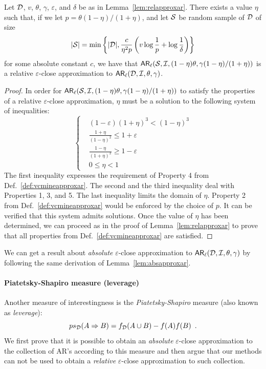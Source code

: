 \begin{lemma}\label{lem:liftrelapproxar}
  Let ${\cal D}$, $v$, $\theta$, $\gamma$, $\varepsilon$, and $\delta$ be as in
  Lemma~\ref{lem:relapproxar}. There exists a value $\eta$ such that, if we let
  $p=\theta(1-\eta)/(1+\eta)$, and let ${\cal S}$ be random sample of ${\cal D}$ of size
  \[
  |{\cal S}|=\min\left\{|{\cal D}|,\frac{c}{\eta^2p}\left(v\log\frac{1}{p}+\log\frac{1}{\delta}\right)\right\}
  \]
  for some absolute constant $c$, we have that
  $\mathsf{AR}_{\ell}({\cal S},{\cal I},(1-\eta)\theta,\gamma(1-\eta)/(1+\eta))$ is a relative
  $\varepsilon$-close approximation to $\mathsf{AR}_{\ell}({\cal D},{\cal I},\theta,\gamma)$.
\end{lemma}
\begin{proof}
 In order for
  $\mathsf{AR}_{\ell}({\cal S},{\cal I},(1-\eta)\theta,\gamma(1-\eta)/(1+\eta))$ to satisfy the
  properties of a relative $\varepsilon$-close approximation, $\eta$
  must be a solution to the following system of inequalities:
 \begin{equation*}
   \left\{
   \begin{aligned}
    &(1-\varepsilon)(1+\eta)^3<(1-\eta)^3\\
    &\frac{1+\eta}{(1-\eta)^2}\le 1+\varepsilon\\
    &\frac{1-\eta}{(1+\eta)^2}\ge 1-\varepsilon\\
    &0\le \eta<1
  \end{aligned}
  \right.
  \end{equation*}
    The first inequality expresses the requirement of Property 4 from
  Def.~\ref{def:vcmineapproxar}. The second and the third inequality deal with
  Properties 1, 3, and 5. The last inequality limits the domain of $\eta$.
  Property 2 from Def.~\ref{def:vcmineapproxar} would be enforced by the choice of
  $p$. It can be verified that this system admits solutions.
Once the value of $\eta$ has been determined, we can proceed as in the
  proof of Lemma~\ref{lem:relapproxar} to prove that all properties from
  Def.~\ref{def:vcmineapproxar} are satisfied.
\end{proof}

We can get a result about \emph{absolute} $\varepsilon$-close approximation to
$\mathsf{AR}_\ell({\cal D},{\cal I},\theta,\gamma)$ by following the same derivation of
Lemma~\ref{lem:absapproxar}.

\paragraph{Piatetsky-Shapiro measure (leverage)}
Another measure of interestingness is the
\emph{Piatetsky-Shapiro} measure (also known as \emph{leverage}):
\[
  ps_{\cal D}(A\Rightarrow B) = f_{\cal D}(A\cup B)-f(A)f(B)\enspace.
\]
We first prove that it is possible to obtain an \emph{absolute}
$\varepsilon$-close approximation to the collection of AR's according to this
measure and then argue that our methods can not be used to obtain a
\emph{relative} $\varepsilon$-close approximation to such collection.

